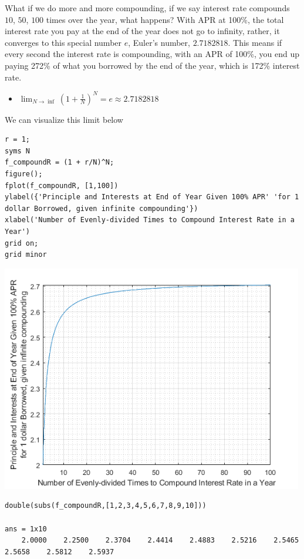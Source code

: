 \documentclass[
]{book}
\providecommand{\tightlist}{%
  \setlength{\itemsep}{0pt}\setlength{\parskip}{0pt}}
\begin{document}
What if we do more and more compounding, if we say interest rate
compounds \(10\), \(50\), \(100\) times over the year, what happens? With APR
at 100\%, the total interest rate you pay at the end of the year does not
go to infinity, rather, it converges to this special number \(e\), Euler's
number, \(2.7182818\). This means if every second the interest rate is
compounding, with an APR of 100\%, you end up paying 272\% of what you
borrowed by the end of the year, which is 172\% interest rate.

\begin{itemize}
\tightlist
\item
  \(\displaystyle \lim_{N\to \inf } (1+\frac{1}{N})^N =e\approx 2.7182818\)
\end{itemize}

We can visualize this limit below

\begin{verbatim}
r = 1;
syms N
f_compoundR = (1 + r/N)^N;
figure();
fplot(f_compoundR, [1,100])
ylabel({'Principle and Interests at End of Year Given 100% APR' 'for 1 dollar Borrowed, given infinite compounding'})
xlabel('Number of Evenly-divided Times to Compound Interest Rate in a Year')
grid on;
grid minor
\end{verbatim}

\includegraphics[width=5.20833in,height=\textheight]{img/exponential_images/figure_1.png}

\begin{verbatim}
double(subs(f_compoundR,[1,2,3,4,5,6,7,8,9,10]))

ans = 1x10    
    2.0000    2.2500    2.3704    2.4414    2.4883    2.5216    2.5465    2.5658    2.5812    2.5937
\end{verbatim}
\end{document}
